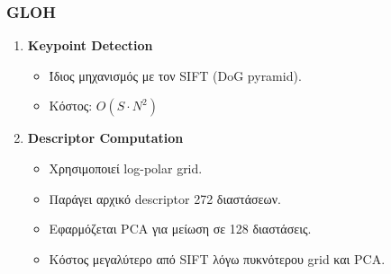 \documentclass[12pt]{article}
\begin{document}
\subsubsection{GLOH}
\begin{enumerate}
    \item \textbf{Keypoint Detection}
    \begin{itemize}
        \item Ίδιος μηχανισμός με τον SIFT (DoG pyramid).
        \item Κόστος: $O(S \cdot N^2)$
    \end{itemize}

    \item \textbf{Descriptor Computation}
    \begin{itemize}
        \item Χρησιμοποιεί log-polar grid.
        \item Παράγει αρχικό descriptor 272 διαστάσεων.
        \item Εφαρμόζεται PCA για μείωση σε 128 διαστάσεις.
        \item Κόστος μεγαλύτερο από SIFT λόγω πυκνότερου grid και PCA.
    \end{itemize}
\end{enumerate}
\end{document}

